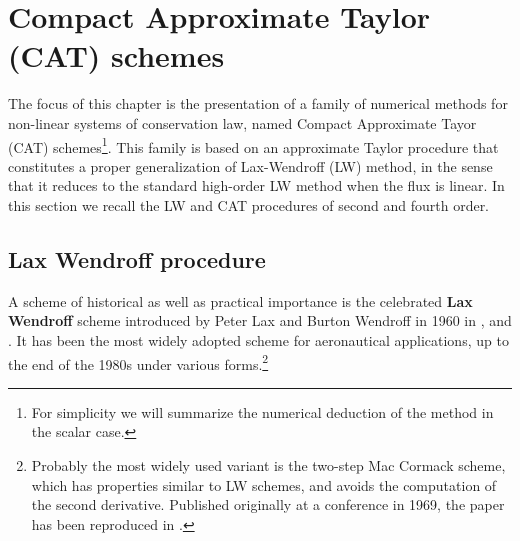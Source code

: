 %
\section{Compact Approximate Taylor (CAT) schemes} \label{sec:CAT} 

The focus of this chapter is the presentation of a family of numerical methods for non-linear systems of conservation law, named Compact Approximate Tayor (CAT) schemes\footnote{For simplicity we will summarize the numerical deduction of the method in the scalar case.}.
This family is based on an approximate Taylor procedure that constitutes a proper generalization of Lax-Wendroff (LW) method, in the sense that it reduces to the standard high-order LW method when the flux is linear. 
%
In this section we recall the LW and CAT procedures of second and fourth order.

\subsection{Lax Wendroff procedure} \label{ssec:LW}
A scheme of historical as well as practical importance is the celebrated \textbf{Lax Wendroff} scheme introduced by Peter Lax and Burton Wendroff in 1960 in \cite{LaxWendroff}, and \cite{Lax1957,Wendroff,LaxWendroffHigh,Hirsch22007,Toro2009}. It has been the most widely adopted scheme for aeronautical applications, up to the end of the 1980s under various forms.\footnote{Probably the most widely used variant is the two-step Mac Cormack scheme, which has properties similar to LW schemes, and avoids the computation of the second derivative. 
Published originally at a conference in 1969, the paper has been reproduced in \cite{maccormack2002effect}.}



